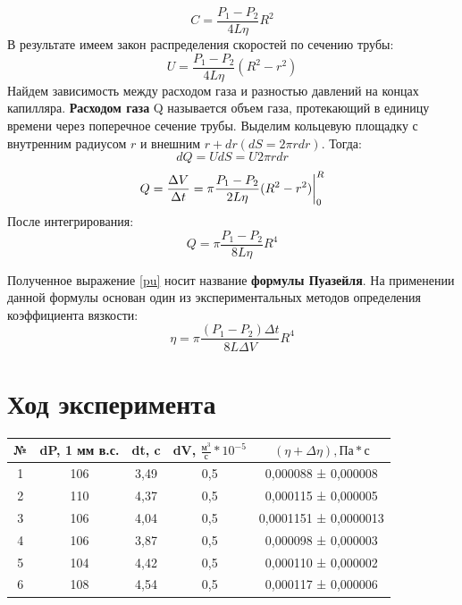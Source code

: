 \documentclass[a4paper,12pt]{article}
\begin{document}
$$C = \frac{P_1 - P_2}{4L\eta}R^2$$
В результате имеем закон распределения скоростей по сечению трубы:
\begin{equation}\label{distrib}
U = \frac{P_1 - P_2}{4L\eta}(R^2-r^2)
\end{equation}
Найдем зависимость между расходом газа и разностью давлений на
концах капилляра. \textbf{Расходом газа} Q называется объем газа, протекающий в единицу времени через поперечное сечение трубы.
Выделим кольцевую площадку с внутренним радиусом $r$ и внешним $r + dr (dS = 2\pi rdr)$. Тогда:
$$dQ = UdS = U2\pi rdr$$
$$Q = \frac{\Delta V}{\Delta t} = \pi\frac{P_1 - P_2}{2L\eta}(R^2-r^2)\bigg|_0^R \vspace{0.2cm}$$
После интегрирования:
\begin{equation}\label{pu}
Q = \pi\frac{P_1 - P_2}{8L\eta}R^4
\end{equation}

Полученное выражение \eqref{pu} носит название \textbf{формулы Пуазейля}. На применении данной формулы основан один из экспериментальных методов определения коэффициента вязкости:
\begin{equation}
\eta = \pi\frac{(P_1-P_2)\Delta t}{8L\Delta V}R^4
\end{equation}

\newpage
\section{Ход эксперимента}

\begin{center}
	\begin{tabular}{|c|c|c|c|c|}
		\hline

		№&dP, 1 мм в.с.&dt, c&dV, $\frac{м^3}{с}*10^{-5}$&$(\eta +\Delta\eta), Па*с$\\
		\hline
		1& 106 & 3,49 & 0,5 & 0,000088 ± 0,000008
		\\
		2& 110 & 4,37 & 0,5 & 0,000115 ± 0,000005
		\\
		3& 106 & 4,04 & 0,5 & 0,0001151 ± 0,0000013
		\\
		4& 106 & 3,87 & 0,5 & 0,000098 ± 0,000003
		\\
		5& 104 & 4,42 & 0,5 & 0,000110 ± 0,000002
		\\ 
		6& 108 & 4,54 & 0,5 & 0,000117 ± 0,000006
		\\
		\hline
	\end{tabular}
\end{center}
\end{document}
